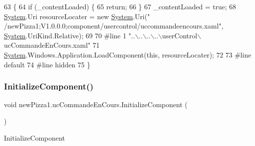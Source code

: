 \begin{DoxyCode}
63                                           \{
64             \textcolor{keywordflow}{if} (\_contentLoaded) \{
65                 \textcolor{keywordflow}{return};
66             \}
67             \_contentLoaded = \textcolor{keyword}{true};
68             \hyperlink{namespaceSystem}{System}.Uri resourceLocater = \textcolor{keyword}{new} \hyperlink{namespaceSystem}{System}.Uri(\textcolor{stringliteral}{"
      /newPizza1;V1.0.0.0;component/usercontrol/uccommandeencours.xaml"}, \hyperlink{namespaceSystem}{System}.UriKind.Relative);
69             
70 \textcolor{preprocessor}{            #line 1 "..\(\backslash\)..\(\backslash\)..\(\backslash\)..\(\backslash\)userControl\(\backslash\)ucCommandeEnCours.xaml"
}
71             \hyperlink{namespaceSystem}{System}.Windows.Application.LoadComponent(\textcolor{keyword}{this}, resourceLocater);
72             
73 \textcolor{preprocessor}{            #line default
}
74 \textcolor{preprocessor}{            #line hidden
}
75         \}
\end{DoxyCode}
\mbox{\label{classnewPizza1_1_1ucCommandeEnCours_a5838b3aa1f180eda285120814af5dadd}} 
\subsubsection{\texorpdfstring{Initialize\+Component()}{InitializeComponent()}\hspace{0.1cm}{\footnotesize\ttfamily [2/6]}}
{\footnotesize\ttfamily void new\+Pizza1.\+uc\+Commande\+En\+Cours.\+Initialize\+Component (\begin{DoxyParamCaption}{ }\end{DoxyParamCaption})\hspace{0.3cm}{\ttfamily [inline]}}



Initialize\+Component 


